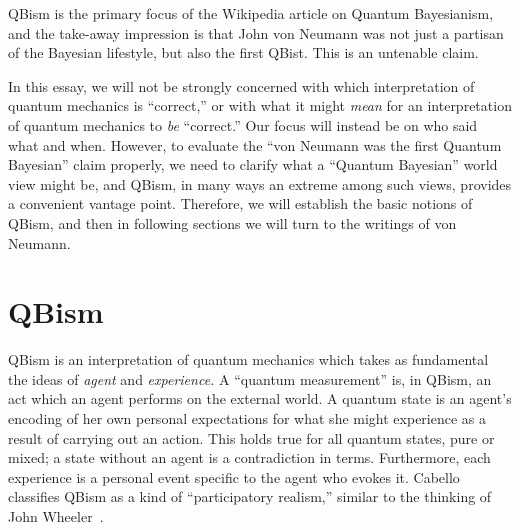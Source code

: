 \documentclass[aps,pra,superscriptaddress,12pt,tightenlines,nofootinbib]{revtex4}
\begin{document}
QBism is the primary focus of the Wikipedia article on
Quantum Bayesianism, and the take-away impression is that John von
Neumann was not just a partisan of the Bayesian lifestyle, but also
the first QBist.  This is an untenable claim.

In this essay, we will not be strongly concerned with which
interpretation of quantum mechanics is ``correct,'' or with what it
might \emph{mean} for an interpretation of quantum mechanics to
\emph{be} ``correct.''  Our focus will instead be on who said what and
when.  However, to evaluate the ``von Neumann was the first Quantum
Bayesian'' claim properly, we need to clarify what a ``Quantum
Bayesian'' world view might be, and QBism, in many ways an extreme
among such views, provides a convenient vantage point.  Therefore, we
will establish the basic notions of QBism, and then in following
sections we will turn to the writings of von Neumann.

\section{QBism}
\label{sec:qbism}
QBism is an interpretation of quantum mechanics which takes as
fundamental the ideas of \emph{agent} and \emph{experience.}  A
``quantum measurement'' is, in QBism, an act which an agent performs
on the external world.  A quantum state is an agent's encoding of her
own personal expectations for what she might experience as a result of
carrying out an action.  This holds true for all quantum states, pure
or mixed; a state without an agent is a contradiction in terms.
Furthermore, each experience is a personal event specific to the agent
who evokes it.  Cabello classifies QBism as a kind of ``participatory
realism,'' similar to the thinking of John Wheeler~\cite{Cabello2015}.
\end{document}

